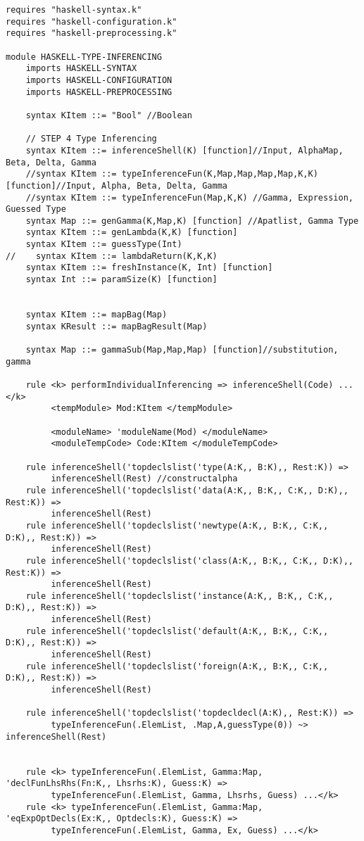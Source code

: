 \begin{lstlisting}
requires "haskell-syntax.k"
requires "haskell-configuration.k"
requires "haskell-preprocessing.k"

module HASKELL-TYPE-INFERENCING
    imports HASKELL-SYNTAX
    imports HASKELL-CONFIGURATION
    imports HASKELL-PREPROCESSING

    syntax KItem ::= "Bool" //Boolean

    // STEP 4 Type Inferencing
    syntax KItem ::= inferenceShell(K) [function]//Input, AlphaMap, Beta, Delta, Gamma
    //syntax KItem ::= typeInferenceFun(K,Map,Map,Map,Map,K,K) [function]//Input, Alpha, Beta, Delta, Gamma
    //syntax KItem ::= typeInferenceFun(Map,K,K) //Gamma, Expression, Guessed Type
    syntax Map ::= genGamma(K,Map,K) [function] //Apatlist, Gamma Type
    syntax KItem ::= genLambda(K,K) [function]
    syntax KItem ::= guessType(Int)
//    syntax KItem ::= lambdaReturn(K,K,K)
    syntax KItem ::= freshInstance(K, Int) [function]
    syntax Int ::= paramSize(K) [function]


    syntax KItem ::= mapBag(Map)
    syntax KResult ::= mapBagResult(Map)

    syntax Map ::= gammaSub(Map,Map,Map) [function]//substitution, gamma

    rule <k> performIndividualInferencing => inferenceShell(Code) ...</k>
         <tempModule> Mod:KItem </tempModule>

         <moduleName> 'moduleName(Mod) </moduleName>
         <moduleTempCode> Code:KItem </moduleTempCode>

    rule inferenceShell('topdeclslist('type(A:K,, B:K),, Rest:K)) =>
         inferenceShell(Rest) //constructalpha
    rule inferenceShell('topdeclslist('data(A:K,, B:K,, C:K,, D:K),, Rest:K)) =>
         inferenceShell(Rest)
    rule inferenceShell('topdeclslist('newtype(A:K,, B:K,, C:K,, D:K),, Rest:K)) =>
         inferenceShell(Rest)
    rule inferenceShell('topdeclslist('class(A:K,, B:K,, C:K,, D:K),, Rest:K)) =>
         inferenceShell(Rest)
    rule inferenceShell('topdeclslist('instance(A:K,, B:K,, C:K,, D:K),, Rest:K)) =>
         inferenceShell(Rest)
    rule inferenceShell('topdeclslist('default(A:K,, B:K,, C:K,, D:K),, Rest:K)) =>
         inferenceShell(Rest)
    rule inferenceShell('topdeclslist('foreign(A:K,, B:K,, C:K,, D:K),, Rest:K)) =>
         inferenceShell(Rest)

    rule inferenceShell('topdeclslist('topdecldecl(A:K),, Rest:K)) =>
         typeInferenceFun(.ElemList, .Map,A,guessType(0)) ~> inferenceShell(Rest)


    rule <k> typeInferenceFun(.ElemList, Gamma:Map, 'declFunLhsRhs(Fn:K,, Lhsrhs:K), Guess:K) =>
         typeInferenceFun(.ElemList, Gamma, Lhsrhs, Guess) ...</k>
    rule <k> typeInferenceFun(.ElemList, Gamma:Map, 'eqExpOptDecls(Ex:K,, Optdecls:K), Guess:K) =>
         typeInferenceFun(.ElemList, Gamma, Ex, Guess) ...</k>
\end{lstlisting}

